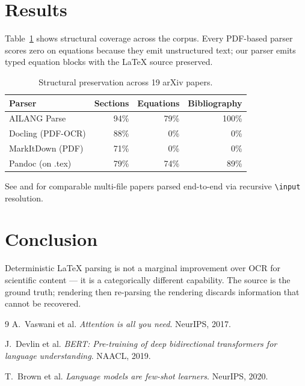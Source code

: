 \documentclass{article}
\begin{document}
\section{Results}

Table~\ref{tab:results} shows structural coverage across the corpus.
Every PDF-based parser scores zero on equations because they emit
unstructured text; our parser emits typed equation blocks with the
LaTeX source preserved.

\begin{table}[h]
\centering
\begin{tabular}{lrrr}
\hline
Parser & Sections & Equations & Bibliography \\
\hline
AILANG Parse       & 94\% & 79\% & 100\% \\
Docling (PDF-OCR)  & 88\% &  0\% &   0\% \\
MarkItDown (PDF)   & 71\% &  0\% &   0\% \\
Pandoc (on .tex)   & 79\% & 74\% &  89\% \\
\hline
\end{tabular}
\caption{Structural preservation across 19 arXiv papers.}
\label{tab:results}
\end{table}

See \cite{devlin2019bert} and \cite{brown2020gpt3} for comparable
multi-file papers parsed end-to-end via recursive \texttt{\textbackslash input}
resolution.

\section{Conclusion}

Deterministic LaTeX parsing is not a marginal improvement over OCR
for scientific content --- it is a categorically different
capability. The source is the ground truth; rendering then re-parsing
the rendering discards information that cannot be recovered.

\begin{thebibliography}{9}
  A.\ Vaswani et al.
  \emph{Attention is all you need}.
  NeurIPS, 2017.

  J.\ Devlin et al.
  \emph{BERT: Pre-training of deep bidirectional transformers for
  language understanding}.
  NAACL, 2019.

  T.\ Brown et al.
  \emph{Language models are few-shot learners}.
  NeurIPS, 2020.
\end{thebibliography}
\end{document}
